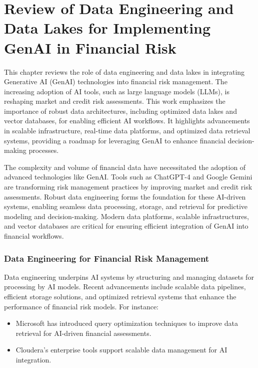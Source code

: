\documentclass[a4paper,12pt]{scrbook}
\begin{document}
	\chapter{Review of Data Engineering and Data Lakes for Implementing GenAI in Financial Risk}
	
	This chapter reviews the role of data engineering and data lakes in integrating Generative AI (GenAI) technologies into financial risk management. The increasing adoption of AI tools, such as large language models (LLMs), is reshaping market and credit risk assessments. This work emphasizes the importance of robust data architectures, including optimized data lakes and vector databases, for enabling efficient AI workflows. It highlights advancements in scalable infrastructure, real-time data platforms, and optimized data retrieval systems, providing a roadmap for leveraging GenAI to enhance financial decision-making processes.
	
	The complexity and volume of financial data have necessitated the adoption of advanced technologies like GenAI. Tools such as ChatGPT-4 and Google Gemini are transforming risk management practices by improving market and credit risk assessments. Robust data engineering forms the foundation for these AI-driven systems, enabling seamless data processing, storage, and retrieval for predictive modeling and decision-making. Modern data platforms, scalable infrastructures, and vector databases are critical for ensuring efficient integration of GenAI into financial workflows.
	
	\subsection{Data Engineering for Financial Risk Management}
	Data engineering underpins AI systems by structuring and managing datasets for processing by AI models. Recent advancements include scalable data pipelines, efficient storage solutions, and optimized retrieval systems that enhance the performance of financial risk models. For instance:
	\begin{itemize}
		\item Microsoft has introduced query optimization techniques to improve data retrieval for AI-driven financial assessments.
		\item Cloudera's enterprise tools support scalable data management for AI integration.
	\end{itemize}
	
\end{document}
